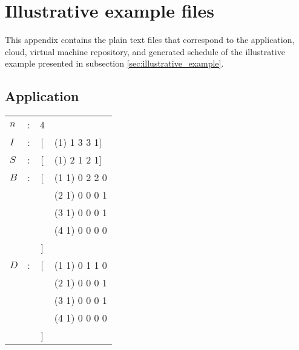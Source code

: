 \chapter{Illustrative example files}
\label{appendix:example_files}

This appendix contains the plain text files that correspond to the
application, cloud, virtual machine repository, and generated
schedule of the illustrative example presented in subsection
\ref{sec:illustrative_example}.

\section{Application}


    \begin{tabular}{l c c l}
        $n$ & : & 4 &\\
        $I$ & : & [ & (1) 1 3 3 1]\\

        $S$ & : & [ & (1) 2 1 2 1]\\
        $B$ & : & [ & (1 1) 0 2 2 0 \\
            &   &   & (2 1) 0 0 0 1 \\
            &   &   & (3 1) 0 0 0 1 \\
            &   &   & (4 1) 0 0 0 0\\
            &   & ] & \\
        $D$ & : & [ & (1 1) 0 1 1 0 \\
            &   &   & (2 1) 0 0 0 1 \\
            &   &   & (3 1) 0 0 0 1 \\
            &   &   & (4 1) 0 0 0 0\\
            &   & ] & \\
    \end{tabular}



